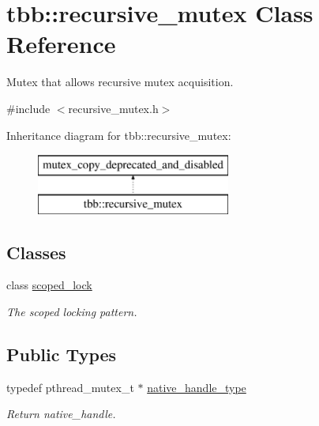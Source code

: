 \hypertarget{classtbb_1_1recursive__mutex}{}\section{tbb\+:\+:recursive\+\_\+mutex Class Reference}
\label{classtbb_1_1recursive__mutex}


Mutex that allows recursive mutex acquisition.  




{\ttfamily \#include $<$recursive\+\_\+mutex.\+h$>$}

Inheritance diagram for tbb\+:\+:recursive\+\_\+mutex\+:\begin{figure}[H]
\begin{center}
\leavevmode
\includegraphics[height=2.000000cm]{classtbb_1_1recursive__mutex}
\end{center}
\end{figure}
\subsection*{Classes}
\begin{DoxyCompactItemize}
\item 
class \hyperlink{classtbb_1_1recursive__mutex_1_1scoped__lock}{scoped\+\_\+lock}
\begin{DoxyCompactList}\small\item\em The scoped locking pattern. \end{DoxyCompactList}\end{DoxyCompactItemize}
\subsection*{Public Types}
\begin{DoxyCompactItemize}
\item 
\hypertarget{classtbb_1_1recursive__mutex_a59f90e65656fec5a07e375c6e7cd39f3}{}typedef pthread\+\_\+mutex\+\_\+t $\ast$ \hyperlink{classtbb_1_1recursive__mutex_a59f90e65656fec5a07e375c6e7cd39f3}{native\+\_\+handle\+\_\+type}\label{classtbb_1_1recursive__mutex_a59f90e65656fec5a07e375c6e7cd39f3}

\begin{DoxyCompactList}\small\item\em Return native\+\_\+handle. \end{DoxyCompactList}\end{DoxyCompactItemize}
